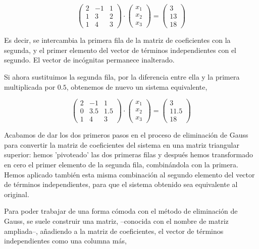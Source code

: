 \begin{equation*}
\begin{pmatrix}
2& -1& 1\\
1& 3& 2\\
1& 4& 3
\end{pmatrix}\cdot \begin{pmatrix}
x_1\\
x_2\\
x_3
\end{pmatrix}=\begin{pmatrix}
3\\
13\\
18
\end{pmatrix}
\end{equation*}

Es decir, se intercambia la primera fila de la matriz de coeficientes con la segunda, y el primer elemento del vector de términos independientes con el segundo. El vector de incógnitas permanece inalterado. 

Si ahora sustituimos la segunda fila, por la diferencia entre ella y la primera multiplicada por $0.5$, obtenemos de nuevo un sistema equivalente, 

\begin{equation*}
\begin{pmatrix}
2& -1& 1\\
0& 3.5& 1.5\\
1& 4& 3
\end{pmatrix}\cdot \begin{pmatrix}
x_1\\
x_2\\
x_3
\end{pmatrix}=\begin{pmatrix}
3\\
11.5\\
18
\end{pmatrix}
\end{equation*}

Acabamos de dar los dos primeros pasos en el proceso de eliminación de Gauss para convertir la matriz de coeficientes del sistema en una matriz triangular superior: hemos 'pivoteado' las dos primeras filas y después hemos transformado en cero el primer elemento de la segunda fila, combinándola con la primera. Hemos aplicado también esta misma combinación al segundo elemento del vector de términos independientes, para que el sistema obtenido sea equivalente al original.

Para poder trabajar de una forma cómoda con el método de eliminación de Gauss, se suele construir una matriz, --conocida con el nombre de matriz ampliada--, añadiendo a la matriz de coeficientes, el vector de términos independientes como una columna más,

